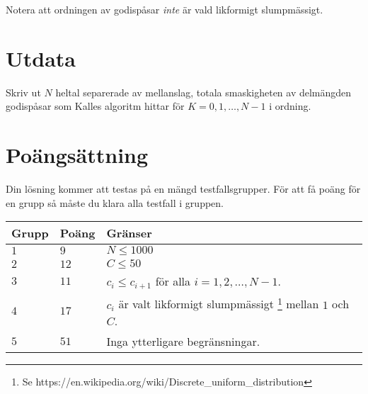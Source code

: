 Notera att ordningen av godispåsar \textit{inte} är vald likformigt slumpmässigt. 

\section*{Utdata}
Skriv ut $N$ heltal separerade av mellanslag, totala smaskigheten av delmängden godispåsar som Kalles
algoritm hittar för $K=0,1,\dots,N-1$ i ordning. 

\section*{Poängsättning}
Din lösning kommer att testas på en mängd testfallsgrupper.
För att få poäng för en grupp så måste du klara alla testfall i gruppen.

\noindent
\begin{tabular}{| l | l | p{12cm} |}
  \hline
  \textbf{Grupp} & \textbf{Poäng} & \textbf{Gränser} \\ \hline
  $1$    & $9$        & $N \leq 1000$ \\ \hline
  $2$    & $12$       & $C \leq 50$ \\ \hline
  $3$    & $11$       & $c_i \leq c_{i+1}$ för alla $i=1,2,\dots,N-1$. \\ \hline
  $4$    & $17$       & $c_i$ är valt likformigt slumpmässigt \footnote{Se https://en.wikipedia.org/wiki/Discrete\_uniform\_distribution} mellan $1$ och $C$. \\ \hline
  $5$    & $51$       & Inga ytterligare begränsningar. \\ \hline
\end{tabular}


